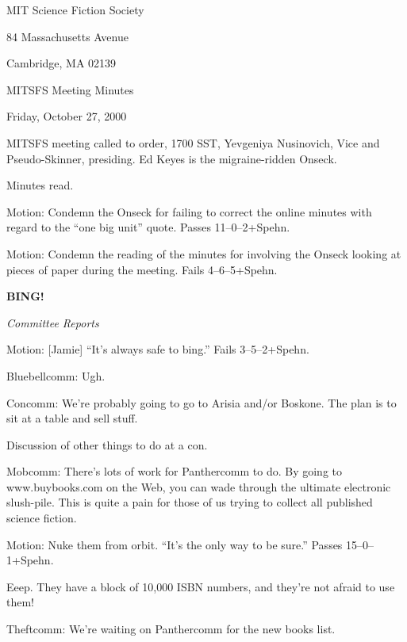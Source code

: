 \documentclass[12pt]{article}
\newcommand{\bing}{{\bf BING!} }
\newcommand{\goto}[1]{\bing \vskip 12pt \centerline{{\em{#1}}}}
\begin{document}
\begin{center}

MIT Science Fiction Society 

84 Massachusetts Avenue

Cambridge, MA 02139

\vspace{12pt}

MITSFS Meeting Minutes 

Friday, October 27, 2000

\end{center}
 
\vspace{18pt}

\setlength{\parskip}{6pt}

\noindent
MITSFS meeting called to order, 1700 SST, Yevgeniya Nusinovich, Vice and
Pseudo-Skinner, presiding.  Ed Keyes is the migraine-ridden Onseck.


Minutes read.

Motion: Condemn the Onseck for failing to correct the online minutes
with regard to the ``one big unit'' quote.  Passes 11--0--2+Spehn.

Motion: Condemn the reading of the minutes for involving the Onseck
looking at pieces of paper during the meeting.  Fails 4--6--5+Spehn.

\goto{Committee Reports}

Motion: [Jamie] ``It's always safe to bing.''  Fails 3--5--2+Spehn.

Bluebellcomm: Ugh.

Concomm: We're probably going to go to Arisia and/or Boskone.  The
plan is to sit at a table and sell stuff.

Discussion of other things to do at a con.

Mobcomm: There's lots of work for Panthercomm to do.  By going to
www.buybooks.com on the Web, you can wade through the ultimate
electronic slush-pile.  This is quite a pain for those of us trying
to collect all published science fiction.

Motion: Nuke them from orbit.  ``It's the only way to be sure.''
Passes 15--0--1+Spehn.

Eeep.  They have a block of 10,000 ISBN numbers, and they're not
afraid to use them!

Theftcomm: We're waiting on Panthercomm for the new books list.
\end{document}
